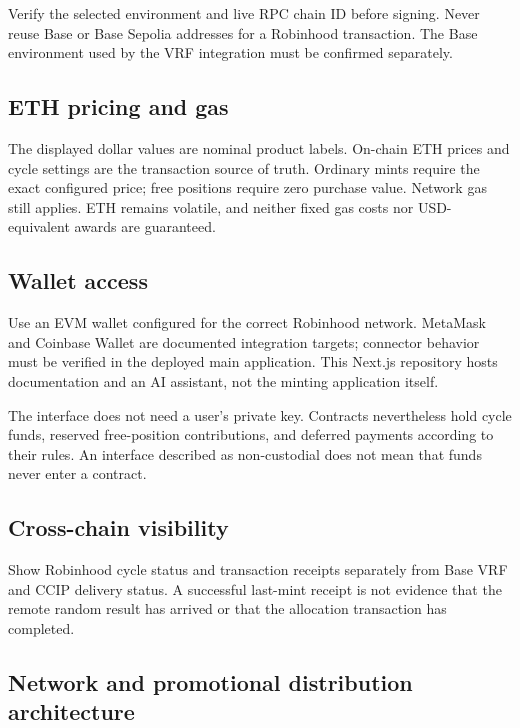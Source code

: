 \documentclass[
  10pt,
  letterpaper,
]{article}
\begin{document}
Verify the selected environment and live RPC chain ID before signing.
Never reuse Base or Base Sepolia addresses for a Robinhood transaction.
The Base environment used by the VRF integration must be confirmed
separately.

\subsection{ETH pricing and gas}\label{eth-pricing-and-gas}

The displayed dollar values are nominal product labels. On-chain ETH
prices and cycle settings are the transaction source of truth. Ordinary
mints require the exact configured price; free positions require zero
purchase value. Network gas still applies. ETH remains volatile, and
neither fixed gas costs nor USD-equivalent awards are guaranteed.

\subsection{Wallet access}\label{wallet-access}

Use an EVM wallet configured for the correct Robinhood network. MetaMask
and Coinbase Wallet are documented integration targets; connector
behavior must be verified in the deployed main application. This Next.js
repository hosts documentation and an AI assistant, not the minting
application itself.

The interface does not need a user's private key. Contracts nevertheless
hold cycle funds, reserved free-position contributions, and deferred
payments according to their rules. An interface described as
non-custodial does not mean that funds never enter a contract.

\subsection{Cross-chain visibility}\label{cross-chain-visibility}

Show Robinhood cycle status and transaction receipts separately from
Base VRF and CCIP delivery status. A successful last-mint receipt is not
evidence that the remote random result has arrived or that the
allocation transaction has completed.

\subsection{Network and promotional distribution
architecture}\label{network-and-promotional-distribution-architecture}
\end{document}
